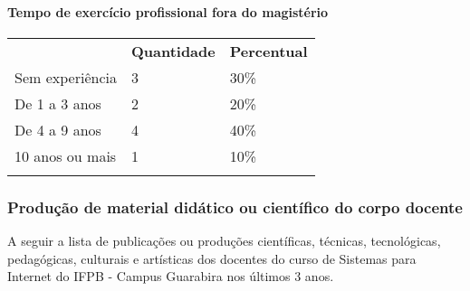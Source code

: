 \paragraph{Tempo de exercício profissional fora do magistério}

\begin{table}[h]
\begin{tabular}{lll}
\rowcolor[HTML]{C0C0C0} 
\multicolumn{1}{c}{\cellcolor[HTML]{C0C0C0}\textbf{Experiência Profissional Fora do Magistério}} & \multicolumn{1}{c}{\cellcolor[HTML]{C0C0C0}\textbf{Quantidade}} & \multicolumn{1}{c}{\cellcolor[HTML]{C0C0C0}\textbf{Percentual}} \\
Sem experiência                                                                                  & 3                                                               & 30\%                                                            \\
De 1 a 3 anos                                                                                    & 2                                                               & 20\%                                                            \\
De 4 a 9 anos                                                                                    & 4                                                               & 40\%                                                            \\
10 anos ou mais                                                                                  & 1                                                               & 10\%                                                            \\
\rowcolor[HTML]{9B9B9B} 
\multicolumn{3}{l}{\cellcolor[HTML]{9B9B9B}}                                                                                                                                                                                        
\end{tabular}
\end{table}

\subsubsection{Produção de material didático ou científico do corpo docente}

A seguir a lista de publicações ou produções científicas, técnicas, tecnológicas, pedagógicas, culturais e artísticas dos docentes do curso de Sistemas para Internet do IFPB - Campus Guarabira nos últimos 3 anos.

